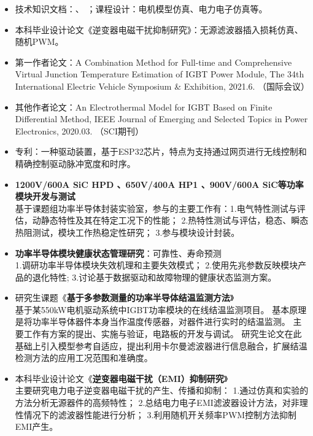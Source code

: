 \documentclass[zh]{resume}
\begin{document}
\begin{itemize}
  \item 技术知识文档：、
  ；课程设计：电机模型仿真、电力电子仿真等。
  \item 本科毕业设计论文《逆变器电磁干扰抑制研究》：无源滤波器插入损耗仿真、随机PWM。
  \item 第一作者论文：{\small A Combination Method for Full-time and Comprehensive Virtual Junction Temperature Estimation of IGBT Power Module, The 34th International Electric Vehicle Symposium \& Exhibition, 2021.6. （国际会议）}
  \item 其他作者论文：{\small An Electrothermal Model for IGBT Based on Finite Differential Method, IEEE Journal of Emerging and Selected Topics in Power Electronics, 2020.03. 
  （SCI期刊） }
  \item 专利：一种驱动装置，基于ESP32芯片，特点为支持通过网页进行无线控制和精确控制驱动脉冲宽度和时序。
\end{itemize}

\begin{itemize}
  \item \textbf{1200V/600A SiC HPD 、650V/400A HP1 、900V/600A SiC等功率模块开发与测试}\\
  {\small 基于课题组功率半导体封装实验室，参与的主要工作有：1.电气特性测试与评估，动静态特性及其在特定工况下的性能；
  2.热特性测试与评估，稳态、瞬态热阻测试，模块工作热稳定性研究；
  3.参与模块设计封装。}
  \item \textbf{功率半导体模块健康状态管理研究}：可靠性、寿命预测\\ 
  {\small 1.调研功率半导体模块失效机理和主要失效模式；
  2.使用先兆参数反映模块产品的退化特性;
  3.讨论基于数据驱动和故障物理的健康状态监测方案。}
  \item 研究生课题《\textbf{基于多参数测量的功率半导体结温监测方法}》\\
  {\small 基于某550kW电机驱动系统中IGBT功率模块的在线结温监测项目。
  基本原理是将功率半导体器件本身当作温度传感器，对器件进行实时的结温监测。
  主要工作有方案的提出、实施与验证，电路板的开发与调试。
  研究生论文在此基础上引入模型参考自适应，提出利用卡尔曼滤波器进行信息融合，扩展结温检测方法的应用工况范围和准确度。}
  \item 本科毕业设计论文《\textbf{逆变器电磁干扰（EMI）抑制研究}》\\ 
  {\small 主要研究电力电子逆变器电磁干扰的产生、传播和抑制：
  1.通过仿真和实验的方法分析无源器件的高频特性；
  2.总结电力电子EMI滤波器设计方法，对非理性情况下的滤波器性能进行分析；
  3.利用随机开关频率PWM控制方法抑制EMI产生。}
  
\end{itemize}
\end{document}
